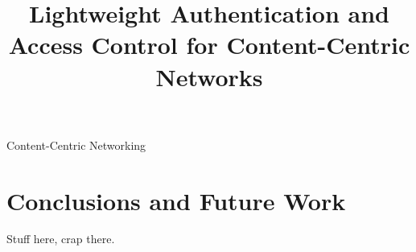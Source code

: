 \documentclass[conference]{IEEEtran}
\begin{document}
\title{Lightweight Authentication and Access Control for Content-Centric Networks} 

\author{
}

\maketitle

\begin{abstract}



\end{abstract}

\begin{IEEEkeywords}
Content-Centric Networking
\end{IEEEkeywords}

\IEEEpeerreviewmaketitle





\section{Conclusions and Future Work}\label{sec:conclusion}
Stuff here, crap there.

\ifCLASSOPTIONcaptionsoff
  \newpage
\fi

\tiny

%
%

\end{document}
